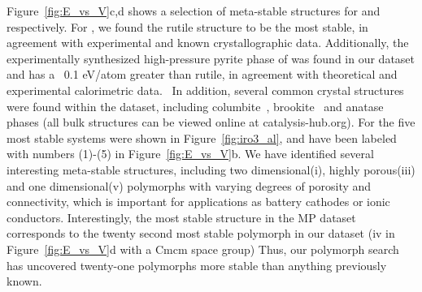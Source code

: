 Figure~\ref{fig:E_vs_V}c,d shows a selection of meta-stable structures for \IrOtwo and \IrOthree respectively.
%
For \IrOtwo, we found the rutile structure to be the most stable,
in agreement with experimental and known crystallographic data.
%
Additionally, the experimentally synthesized high-pressure pyrite phase of \IrOtwo was found in our dataset and has a \DHf ~0.1 eV/atom greater than rutile, in agreement with theoretical and experimental calorimetric data.~\cite{bolzan1997structural, shirako2014synthesis}
%
%
In addition, several common \ABtwo crystal structures were found within the dataset, including columbite~\cite{columbite}, brookite~\cite{brookite} and anatase~\cite{anatase} phases
(all bulk structures can be viewed online at catalysis-hub.org).
%
For \IrOthree the five most stable systems were shown in Figure~\ref{fig:iro3_al}, and have been labeled with numbers (1)-(5) in Figure~\ref{fig:E_vs_V}b.
%
We have identified several interesting meta-stable structures, including two dimensional(i), highly porous(iii) and one dimensional(v) polymorphs with varying degrees of porosity and connectivity,
which is important for applications as battery cathodes or ionic conductors.\cite{}
%
%
Interestingly, the most stable \IrOthree structure in the MP dataset~\cite{mp-1097041} corresponds to the twenty second most stable \IrOthree polymorph in our dataset
(iv in Figure~\ref{fig:E_vs_V}d with a Cmcm space group)
%
Thus, our polymorph search has uncovered twenty-one \IrOthree polymorphs more stable than anything previously known.
